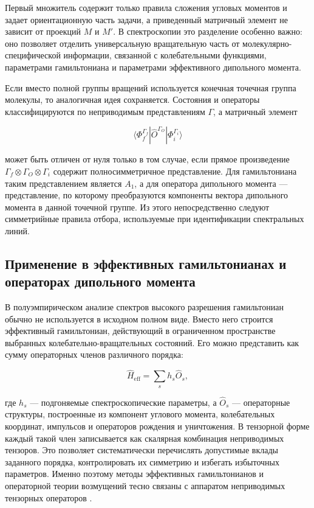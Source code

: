 Первый множитель содержит только правила сложения угловых моментов и
задает ориентационную часть задачи, а приведенный матричный элемент не
зависит от проекций $M$ и $M'$. В спектроскопии это разделение особенно
важно: оно позволяет отделить универсальную вращательную часть от
молекулярно-специфической информации, связанной с колебательными функциями,
параметрами гамильтониана и параметрами эффективного дипольного момента.

Если вместо полной группы вращений используется конечная точечная группа
молекулы, то аналогичная идея сохраняется. Состояния и операторы
классифицируются по неприводимым представлениям $\Gamma$, а матричный
элемент

\begin{equation}
\langle \Phi_f^{\Gamma_f}|\hat{O}^{\Gamma_O}|\Phi_i^{\Gamma_i}\rangle
\end{equation}

может быть отличен от нуля только в том случае, если прямое произведение
$\Gamma_f\otimes\Gamma_O\otimes\Gamma_i$ содержит полносимметричное
представление. Для гамильтониана таким представлением является $A_1$, а для
оператора дипольного момента --- представление, по которому преобразуются
компоненты вектора дипольного момента в данной точечной группе. Из этого
непосредственно следуют симметрийные правила отбора, используемые при
идентификации спектральных линий.

\subsection{Применение в эффективных гамильтонианах и операторах дипольного момента}

В полуэмпирическом анализе спектров высокого разрешения гамильтониан обычно
не используется в исходном полном виде. Вместо него строится эффективный
гамильтониан, действующий в ограниченном пространстве выбранных
колебательно-вращательных состояний. Его можно представить как сумму
операторных членов различного порядка:

\begin{equation}
\hat{H}_{\mathrm{eff}}=\sum_s h_s\hat{O}_s,
\end{equation}

где $h_s$ --- подгоняемые спектроскопические параметры, а $\hat{O}_s$ ---
операторные структуры, построенные из компонент углового момента,
колебательных координат, импульсов и операторов рождения и уничтожения. В
тензорной форме каждый такой член записывается как скалярная комбинация
неприводимых тензоров. Это позволяет систематически перечислять допустимые
вклады заданного порядка, контролировать их симметрию и избегать избыточных
параметров. Именно поэтому методы эффективных гамильтонианов и операторной
теории возмущений тесно связаны с аппаратом неприводимых тензорных
операторов \cite{Makushkin1984,Papousek1982}.


